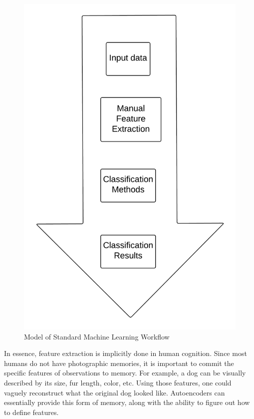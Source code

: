 \documentclass{sig-alternate}
\begin{document}
\begin{figure}[h]
	\begin{center}
		\includegraphics[width=0.75\linewidth]{mlworkflow}
	\end{center}
	\vspace{-12pt}
	\caption{Model of Standard Machine Learning Workflow}
	\label{fig:mlworkflow}
\end{figure}

In essence, feature extraction is implicitly done in human cognition. Since most humans do not have
photographic memories, it is important to commit the specific features of observations to memory. 
For example, a dog can be visually described by its size, fur length, color, etc. Using those
features, one could vaguely reconstruct what the original dog looked like. Autoencoders can essentially
provide this form of memory, along with the ability to figure out how to define features.
\end{document}
